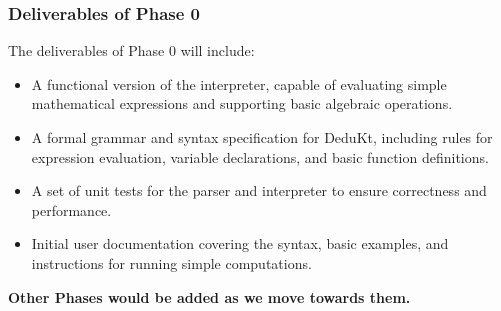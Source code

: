 \subsubsection{Deliverables of Phase 0}
The deliverables of Phase 0 will include:
\begin{itemize}
    \item A functional version of the interpreter, capable of evaluating simple mathematical expressions and supporting basic algebraic operations.
    \item A formal grammar and syntax specification for DeduKt, including rules for expression evaluation, variable declarations, and basic function definitions.
    \item A set of unit tests for the parser and interpreter to ensure correctness and performance.
    \item Initial user documentation covering the syntax, basic examples, and instructions for running simple computations.
\end{itemize}

\hline
\textbf{Other Phases would be added as we move towards them.}